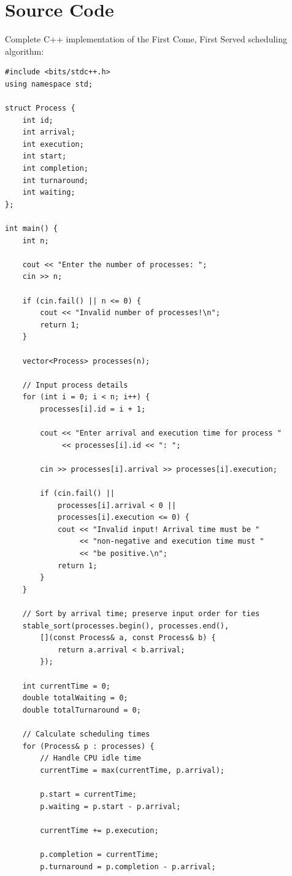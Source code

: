 \documentclass[10pt,a4paper]{article}
\begin{document}
\section{Source Code}
Complete C++ implementation of the First Come, First Served scheduling algorithm:

\begin{lstlisting}
#include <bits/stdc++.h>
using namespace std;

struct Process {
    int id;
    int arrival;
    int execution;
    int start;
    int completion;
    int turnaround;
    int waiting;
};

int main() {
    int n;

    cout << "Enter the number of processes: ";
    cin >> n;

    if (cin.fail() || n <= 0) {
        cout << "Invalid number of processes!\n";
        return 1;
    }

    vector<Process> processes(n);

    // Input process details
    for (int i = 0; i < n; i++) {
        processes[i].id = i + 1;

        cout << "Enter arrival and execution time for process "
             << processes[i].id << ": ";

        cin >> processes[i].arrival >> processes[i].execution;

        if (cin.fail() ||
            processes[i].arrival < 0 ||
            processes[i].execution <= 0) {
            cout << "Invalid input! Arrival time must be "
                 << "non-negative and execution time must "
                 << "be positive.\n";
            return 1;
        }
    }

    // Sort by arrival time; preserve input order for ties
    stable_sort(processes.begin(), processes.end(),
        [](const Process& a, const Process& b) {
            return a.arrival < b.arrival;
        });

    int currentTime = 0;
    double totalWaiting = 0;
    double totalTurnaround = 0;

    // Calculate scheduling times
    for (Process& p : processes) {
        // Handle CPU idle time
        currentTime = max(currentTime, p.arrival);

        p.start = currentTime;
        p.waiting = p.start - p.arrival;

        currentTime += p.execution;

        p.completion = currentTime;
        p.turnaround = p.completion - p.arrival;


\end{lstlisting}
\end{document}

